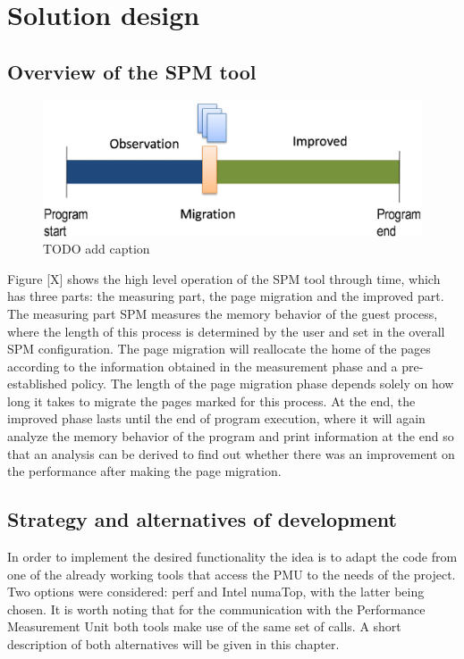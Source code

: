 \chapter{Solution design}\label{chapter:soldesign}


\section{Overview of the SPM tool}\label{section:ovv-spm}


\begin{figure}
	\centering
		\includegraphics[width=.6\textwidth]{figures/spm-principle.eps}
		\caption[sampling-process]{TODO add caption}
		\label{fig:dstrategy}
\end{figure}

Figure [X] shows the high level operation of the SPM tool through time, which has three parts: the measuring part, the page migration and the improved part. The measuring part SPM measures the memory behavior of the guest process, where the length of this process is determined by the user and set in the overall SPM configuration. The page migration will reallocate the home of the pages according to the information obtained in the measurement phase and a pre-established policy. The length of the page migration phase depends solely on how long it takes to migrate the pages marked for this process. At the end, the improved phase lasts until the end of program execution, where it will again analyze the memory behavior of the program and print information at the end so that an analysis can be derived to find out whether there was an improvement on the performance after making the page migration.



\section{Strategy and alternatives of development}\label{section:strat}
In order to implement the desired functionality the idea is to adapt the code from one of the already working tools that access the PMU to the needs of the project. Two options were considered: perf and Intel numaTop, with the latter being chosen. It is worth noting that for the communication with the Performance Measurement Unit both tools make use of the same set of calls. A short description of both alternatives will be given in this chapter.

